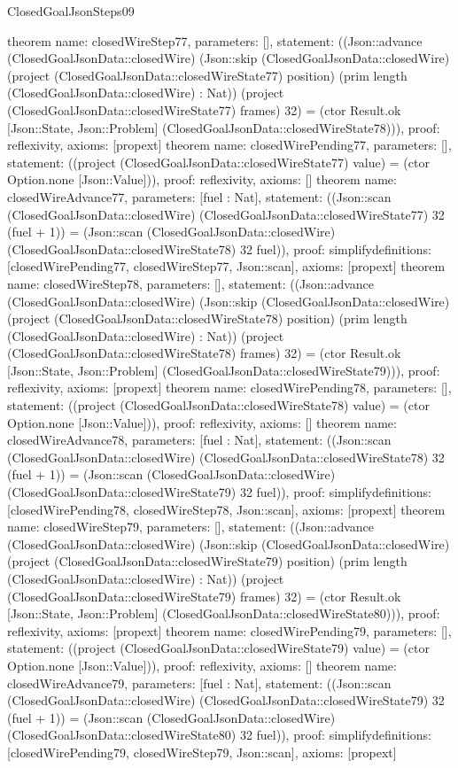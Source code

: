 \begin{lexlean}{ClosedGoalJsonSteps09}
\begin{semanticmodule}
{}
theorem{
 name: closedWireStep77, parameters: [],
 statement: ((Json::advance (ClosedGoalJsonData::closedWire) (Json::skip (ClosedGoalJsonData::closedWire) (project (ClosedGoalJsonData::closedWireState77) position) (prim length (ClosedGoalJsonData::closedWire) : Nat)) (project (ClosedGoalJsonData::closedWireState77) frames) 32) = (ctor Result.ok [Json::State, Json::Problem] (ClosedGoalJsonData::closedWireState78))), proof: reflexivity{}, axioms: [propext]
}
theorem{
 name: closedWirePending77, parameters: [],
 statement: ((project (ClosedGoalJsonData::closedWireState77) value) = (ctor Option.none [Json::Value])), proof: reflexivity{}, axioms: []
}
theorem{
 name: closedWireAdvance77, parameters: [fuel : Nat],
 statement: ((Json::scan (ClosedGoalJsonData::closedWire) (ClosedGoalJsonData::closedWireState77) 32 (fuel + 1)) = (Json::scan (ClosedGoalJsonData::closedWire) (ClosedGoalJsonData::closedWireState78) 32 fuel)), proof: simplify{definitions: [closedWirePending77, closedWireStep77, Json::scan]}, axioms: [propext]
}
theorem{
 name: closedWireStep78, parameters: [],
 statement: ((Json::advance (ClosedGoalJsonData::closedWire) (Json::skip (ClosedGoalJsonData::closedWire) (project (ClosedGoalJsonData::closedWireState78) position) (prim length (ClosedGoalJsonData::closedWire) : Nat)) (project (ClosedGoalJsonData::closedWireState78) frames) 32) = (ctor Result.ok [Json::State, Json::Problem] (ClosedGoalJsonData::closedWireState79))), proof: reflexivity{}, axioms: [propext]
}
theorem{
 name: closedWirePending78, parameters: [],
 statement: ((project (ClosedGoalJsonData::closedWireState78) value) = (ctor Option.none [Json::Value])), proof: reflexivity{}, axioms: []
}
theorem{
 name: closedWireAdvance78, parameters: [fuel : Nat],
 statement: ((Json::scan (ClosedGoalJsonData::closedWire) (ClosedGoalJsonData::closedWireState78) 32 (fuel + 1)) = (Json::scan (ClosedGoalJsonData::closedWire) (ClosedGoalJsonData::closedWireState79) 32 fuel)), proof: simplify{definitions: [closedWirePending78, closedWireStep78, Json::scan]}, axioms: [propext]
}
theorem{
 name: closedWireStep79, parameters: [],
 statement: ((Json::advance (ClosedGoalJsonData::closedWire) (Json::skip (ClosedGoalJsonData::closedWire) (project (ClosedGoalJsonData::closedWireState79) position) (prim length (ClosedGoalJsonData::closedWire) : Nat)) (project (ClosedGoalJsonData::closedWireState79) frames) 32) = (ctor Result.ok [Json::State, Json::Problem] (ClosedGoalJsonData::closedWireState80))), proof: reflexivity{}, axioms: [propext]
}
theorem{
 name: closedWirePending79, parameters: [],
 statement: ((project (ClosedGoalJsonData::closedWireState79) value) = (ctor Option.none [Json::Value])), proof: reflexivity{}, axioms: []
}
theorem{
 name: closedWireAdvance79, parameters: [fuel : Nat],
 statement: ((Json::scan (ClosedGoalJsonData::closedWire) (ClosedGoalJsonData::closedWireState79) 32 (fuel + 1)) = (Json::scan (ClosedGoalJsonData::closedWire) (ClosedGoalJsonData::closedWireState80) 32 fuel)), proof: simplify{definitions: [closedWirePending79, closedWireStep79, Json::scan]}, axioms: [propext]
}
\end{semanticmodule}
\end{lexlean}
